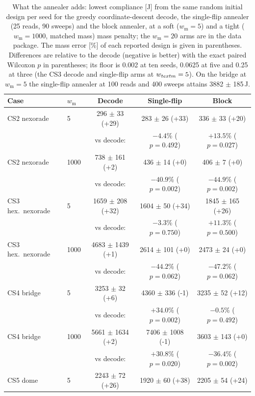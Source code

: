 \begin{table}[!htbp]
\centering
\footnotesize
\caption{What the annealer adds: lowest compliance [J] from the same random initial design per seed for the greedy coordinate-descent decode, the single-flip annealer (25 reads, 90 sweeps) and the block annealer, at a soft ($w_{\text{m}}=5$) and a tight ($w_{\text{m}}=1000$, matched mass) mass penalty; the $w_{\text{m}}=20$ arms are in the data package. The mass error [\%] of each reported design is given in parentheses. Differences are relative to the decode (negative is better) with the exact paired Wilcoxon $p$ in parentheses; its floor is 0.002 at ten seeds, 0.0625 at five and 0.25 at three (the CS3 decode and single-flip arms at $w_{\\text{m}}=5$). On the bridge at $w_{\text{m}}=5$ the single-flip annealer at 100 reads and 400 sweeps attains 3882 $\pm$ 185\,J.}
\label{tab:annealer}
\scriptsize
\setlength{\tabcolsep}{4pt}
\begin{tabular}{llccc}
\toprule
Case & $w_{\text{m}}$ & Decode & Single-flip & Block \\
\midrule
CS2 nexorade & 5 & 296 $\pm$ 33 (+29) & 283 $\pm$ 26 (+33) & 336 $\pm$ 33 (+20) \\
 & & vs decode: & $-4.4$\% ($p=0.492$) & $+13.5$\% ($p=0.027$) \\[2pt]
CS2 nexorade & 1000 & 738 $\pm$ 161 (+2) & 436 $\pm$ 14 (+0) & 406 $\pm$ 7 (+0) \\
 & & vs decode: & $-40.9$\% ($p=0.002$) & $-44.9$\% ($p=0.002$) \\[2pt]
CS3 hex.\ nexorade & 5 & 1659 $\pm$ 208 (+32) & 1604 $\pm$ 50 (+34) & 1845 $\pm$ 165 (+26) \\
 & & vs decode: & $-3.3$\% ($p=0.750$) & $+11.3$\% ($p=0.500$) \\[2pt]
CS3 hex.\ nexorade & 1000 & 4683 $\pm$ 1439 (+1) & 2614 $\pm$ 101 (+0) & 2473 $\pm$ 24 (+0) \\
 & & vs decode: & $-44.2$\% ($p=0.062$) & $-47.2$\% ($p=0.062$) \\[2pt]
CS4 bridge & 5 & 3253 $\pm$ 32 (+6) & 4360 $\pm$ 336 (-1) & 3235 $\pm$ 52 (+12) \\
 & & vs decode: & $+34.0$\% ($p=0.002$) & $-0.5$\% ($p=0.492$) \\[2pt]
CS4 bridge & 1000 & 5661 $\pm$ 1634 (+2) & 7406 $\pm$ 1008 (-1) & 3603 $\pm$ 143 (+0) \\
 & & vs decode: & $+30.8$\% ($p=0.020$) & $-36.4$\% ($p=0.002$) \\[2pt]
CS5 dome & 5 & 2243 $\pm$ 72 (+26) & 1920 $\pm$ 60 (+38) & 2205 $\pm$ 54 (+24) \\

\end{tabular}
\end{table}
